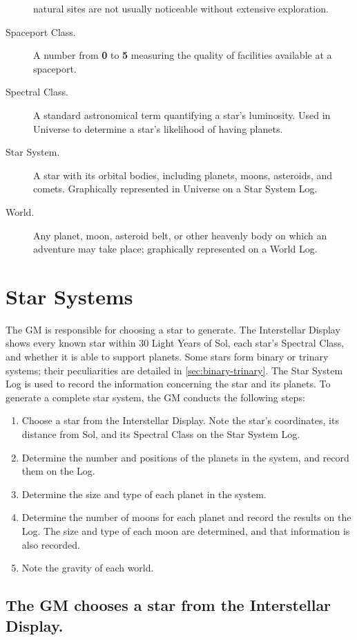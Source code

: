 \begin{description}
  natural sites are not usually noticeable without extensive
  exploration.
\item[Spaceport Class.] A number from \textbf{0} to \textbf{5}
  measuring the quality of facilities available at a spaceport.
\item[Spectral Class.] A standard astronomical term quantifying a
  star's luminosity. Used in Universe to determine a star's likelihood
  of having planets.
\item[Star System.] A star with its orbital bodies, including planets,
  moons, asteroids, and comets. Graphically represented in Universe on
  a Star System Log.
\item[World.] Any planet, moon, asteroid belt, or other heavenly body
  on which an adventure may take place; graphically represented on a
  World Log.
\end{description}

\section{Star Systems}
\label{sec:star-systems}
 
The GM is responsible for choosing a star to generate. The
Interstellar Display shows every known star within 30 Light Years of
Sol, each star's Spectral Class, and whether it is able to support
planets. Some stars form binary or trinary systems; their
peculiarities are detailed in \ref{sec:binary-trinary}. The Star
System Log is used to record the information concerning the star and
its planets. To generate a complete star system, the GM conducts the
following steps:

\begin{enumerate}
\item Choose a star from the Interstellar Display. Note the star's
  coordinates, its distance from Sol, and its Spectral Class on the
  Star System Log.
\item Determine the number and positions of the planets in the system,
  and record them on the Log.
\item Determine the size and type of each planet in the system.
\item Determine the number of moons for each planet and record the
  results on the Log. The size and type of each moon are determined,
  and that information is also recorded.
\item Note the gravity of each world.
\end{enumerate}

\subsection[Interstellar Display]{The GM chooses a star from the
    Interstellar Display.}
\label{sec:interstellar-display}
  
